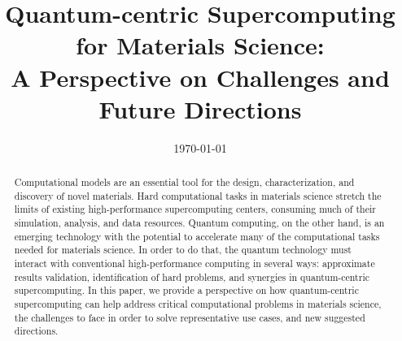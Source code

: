 \documentclass[aps,floatfix,prx,superscriptaddress,reprint,showpacs,10pt,preprintnumbers,longbibliography]{revtex4-2}
\newcommand{\1}{1\!\!1}
\newcommand{\0}{0\hspace{-1.65mm}0}
\begin{document}
\newpage

\title{Quantum-centric Supercomputing for Materials Science:\\ \vspace{0.2cm}
A Perspective on Challenges and Future Directions \vspace{1.2cm}}



\date{\today}

\begin{abstract}
Computational models are an essential tool for the design, characterization, and discovery of novel materials. Hard computational tasks in materials science stretch the limits of existing high-performance supercomputing centers, consuming much of their simulation, analysis, and data resources. Quantum computing, on the other hand, is an emerging technology with the potential to accelerate many of the computational tasks needed for materials science. In order to do that, the quantum technology must interact with conventional high-performance computing in several ways: approximate results validation, identification of hard problems, and synergies in quantum-centric supercomputing. 
In this paper, we provide a perspective on how quantum-centric supercomputing can help address critical computational problems in materials science, the challenges to face in order to solve representative use cases, and new suggested directions.
 
\end{abstract}


\maketitle


















\printglossary[type=\acronymtype]




\end{document}
